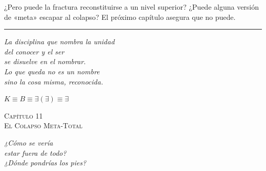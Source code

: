 \documentclass[10pt, openany, oneside]{book}
\renewcommand{\large}{\fontsize{11.5}{14}\selectfont}
\renewcommand{\huge}{\fontsize{17}{21}\selectfont}
\begin{document}
¿Pero puede la fractura reconstituirse a un nivel superior? ¿Puede alguna versión de «meta» escapar al colapso? El próximo capítulo asegura que no puede.

\vspace{2em}

\begin{center}
    \rule{0.15\textwidth}{0.3pt}
\end{center}

\vspace{0.5em}

\begin{center}
    \itshape
    La disciplina que nombra la unidad\\
    del conocer y el ser\\
    se disuelve en el nombrar.\\[0.8em]
    Lo que queda no es un nombre\\
    sino la cosa misma, reconocida.
\end{center}

\vspace{0.5em}

\begin{center}
    $K \equiv B \equiv \exists(\exists) \equiv \exists$
\end{center}

%
%
%
%

\newpage

\begin{center}
    {\huge\scshape Capítulo 11}\\[0.3em]
    {\large\scshape El Colapso Meta-Total}
\end{center}

\vspace{1.5em}

\begin{center}
    \itshape
    ¿Cómo se vería\\
    estar fuera de todo?\\
    ¿Dónde pondrías los pies?
\end{center}
\end{document}
